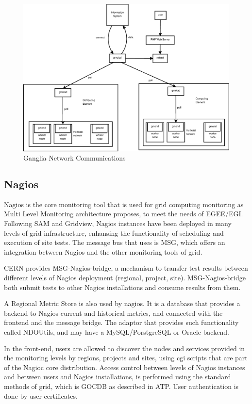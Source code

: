 \begin{figure}[htb]
\centering
 \includegraphics[width=6in]{images/ganglia_data_flow.eps}
\caption{Ganglia Network Communications}
\label{figure:ganglia_network}
\end{figure}

\subsection{Nagios}

Nagios is the core monitoring tool that is used for grid computing monitoring as Multi Level Monitoring architecture proposes, to meet the needs of EGEE/EGI. Following SAM and Gridview, Nagios instances have been deployed in many levels of grid infrastructure, enhansing the functionality of scheduling and execution of site tests. The message bus that uses is MSG, which offers an integration between Nagios and the other monitoring tools of grid.

CERN provides MSG-Nagios-bridge, a mechanism to transfer test results between different levels of Nagios deployment (regional, project, site). MSG-Nagios-bridge both submit tests to other Nagios installations and consume results from them. 

A Regional Metric Store is also used by nagios. It is a database that provides a backend to Nagios current and historical metrics, and connected with the frontend and the message bridge. The adaptor that provides such functionality called NDOUtils, and may have a MySQL/PorstgreSQL or Oracle backend.

In the front-end, users are allowed to discover the nodes and services provided in the monitoring levels by regions, projects and sites, using cgi scripts that are part of the Nagioc core distribution. Access control between levels of Nagios instances and between users and Nagios installations, is performed using the standard methods of grid, which is GOCDB as described in ATP. User authentication is done by user certificates.

